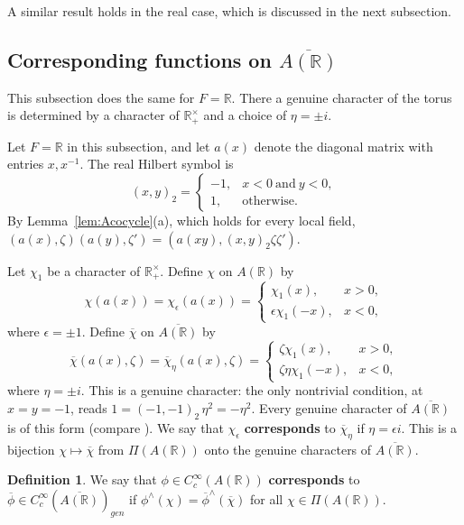 \documentclass[12pt,letterpaper,openany]{book}
\theoremstyle{plain}
\theoremstyle{definition}
\newtheorem{definition}[theorem]{Definition}
\theoremstyle{remark}
\theoremstyle{remark}
\begin{document}
A similar result holds in the real case, which is discussed in the
next subsection.

\subsection{Corresponding functions on \texorpdfstring{$\overline{A({\mathbb{R}})}$}{A(R)-bar}}\label{sec:realA}

This subsection does the same for $F={\mathbb R}$. There a genuine character of the torus is determined by a character of ${\mathbb R}_+^\times$ and a choice of $\eta=\pm i$.


Let $F={\mathbb{R}}$ in this subsection, and let $a(x)$ denote the
diagonal matrix with entries $x,x^{-1}$. The real Hilbert symbol is
\[
(x,y)_2=
\left\{
\begin{array}{ll}
-1, & x<0\ \text{and}\ y<0,\\
1, & \text{otherwise}.
\end{array}
\right.
\]
By
Lemma~\ref{lem:Acocycle}(a), which holds for every local field,
$(a(x),\zeta)(a(y),\zeta')=(a(xy),(x,y)_2\zeta\zeta')$.

Let $\chi_1$ be a character of ${\mathbb{R}}_+^\times$. Define
$\chi$ on $A({\mathbb{R}})$ by
\[
\chi(a(x))=\chi_\epsilon(a(x))
=
\left\{
\begin{array}{ll}
\chi_1(x), & x>0,\\
\epsilon \chi_1(-x), & x<0,
\end{array}
\right.
\]
where $\epsilon =\pm 1$. Define
$\overline{\chi}$ on $\overline{A({\mathbb{R}})}$ by
\[
\overline{\chi}(a(x),\zeta)=\overline{\chi}_\eta(a(x),\zeta)
=
\left\{
\begin{array}{ll}
\zeta\chi_1(x), & x>0,\\
\zeta\eta \chi_1(-x), & x<0,
\end{array}
\right.
\]
where $\eta=\pm i$. This is a genuine character: the only nontrivial
condition, at $x=y=-1$, reads $1=(-1,-1)_2\,\eta^2=-\eta^2$. Every
genuine character of $\overline{A({\mathbb R})}$ is of this form (compare
\cite{GS}). We say that
$\chi_\epsilon$ {\bf corresponds} to $\overline{\chi}_\eta$ if
$\eta =\epsilon i$. This is a bijection
$\chi\mapsto\overline{\chi}$ from $\Pi(A({\mathbb R}))$ onto the genuine
characters of $\overline{A({\mathbb R})}$.

\begin{definition}\label{def:corrA-real}
We say that $\phi \in C_c^\infty(A({\mathbb R}))$ {\bf corresponds} to
$\overline{\phi}\in C_c^\infty(\overline{A({\mathbb R})})_{gen}$
if
$\phi^{\wedge}(\chi)=
\overline{\phi}^{\wedge}(\overline{\chi})$
for all $\chi \in \Pi(A({\mathbb R}))$.
\end{definition}
\end{document}
